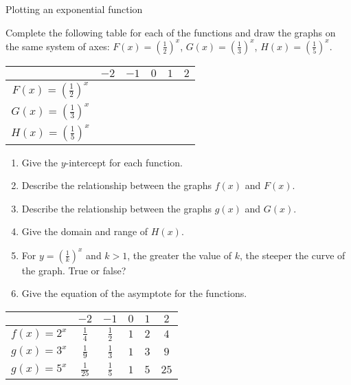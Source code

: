 \begin{wex}{Plotting an exponential function}
{\begin{minipage}{\textwidth}
Complete the following table for each of the functions and draw the graphs on the same system of axes:
$F(x) =(\frac{1}{2})^{x}$, $G(x) =(\frac{1}{3})^{x}$, $H(x) =(\frac{1}{5})^{x}$.
\begin{table}[H]
\begin{center}
\begin{tabular}{|c|c|c|c|c|c|}
\hline
   &  $-2$ & $-1$ & $0$ & $1$ & $2$ 
\\ \hline
$F(x)=(\frac{1}{2})^{x}$&  \hspace{1cm}  & \hspace{1cm} & \hspace{1cm} & \hspace{1cm} & \hspace{1cm} 
\\ \hline
$G(x)=(\frac{1}{3})^{x}$&  &&&&
\\ \hline
$H(x)=(\frac{1}{5})^{x}$&  &&&&
\\ \hline

\end{tabular}
\end{center}
\end{table}

\begin{enumerate}[noitemsep, label=\textbf{\arabic*}. ] 
 \item Give the $y$-intercept for each function.
\item Describe the relationship between the graphs $f(x)$ and $F(x)$.
\item Describe the relationship between the graphs $g(x)$ and $G(x)$.
\item Give the domain and range of $H(x)$.
\item For $y=(\frac{1}{k})^{x}$ and $k>1$, the greater the value of $k$, the steeper the curve of the graph. True or false?
\item Give the equation of the asymptote for the functions.
\end{enumerate}
\end{minipage}
}
{
\begin{table}[H]
\begin{center}
\begin{tabular}{|c|c|c|c|c|c|}
\hline
   &  $-2$ & $-1$ & $0$ & $1$ & $2$ 
\\ \hline
 $f(x)=2^{x}$& $\frac{1}{4}$ &$\frac{1}{2}$&$1$&$2$&$4$
\\ \hline
 $g(x)=3^{x}$& $\frac{1}{9}$ &$\frac{1}{3}$&$1$&$3$&$9$
\\ \hline
 $g(x)=5^{x}$& $\frac{1}{25}$ &$\frac{1}{5}$&$1$&$5$&$25$
\\ \hline


\end{tabular}
\end{center}
\end{table}}
\end{wex}
